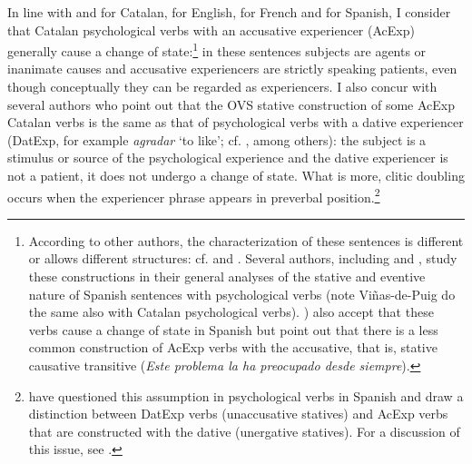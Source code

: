 \documentclass[output=paper,colorlinks,citecolor=brown,modfonts,nonflat]{langsci/langscibook}
\begin{document}
In line with \citet{Ynglès1991, CabréMateu1998, Rossello2008} and \citet[Section 21.5b-c]{GIEC2016} for Catalan, \citet{Pesetsky1995} for English, \citet{Bouchard1995} for French and \citet{Acedo-MatellánMateu2015} for Spanish, I consider that Catalan psychological verbs with an accusative experiencer (AcExp) generally cause a change of state:\footnote{According to other authors, the characterization of these sentences is different or allows different structures: cf. \citet{vanVoorst1992,Arad1999,Landau2010,MarínMcNally2011} and \citet{Fabregas2015experimentante}. Several authors, including \citet{FabregasMarín2012,FábregasMarínMcNally2012,MarínSanchezMarco2012,Ganeshan2014} and \citet{Viñas-de-Puig2014}, study these constructions in their general analyses of the stative and eventive nature of Spanish sentences with psychological verbs (note Viñas-de-Puig do the same also with Catalan psychological verbs). \citealt[83 (4)]{Acedo-MatellánMateu2015}) also accept that these verbs cause a change of state in Spanish but point out that there is a less common construction of AcExp verbs with the accusative, that is, stative causative transitive (\textit{Este problema la ha preocupado desde siempre}).} in these sentences subjects are agents or inanimate causes and accusative experiencers are strictly speaking patients, even though conceptually they can be regarded as experiencers. I also concur with several authors who point out that the OVS stative construction of some AcExp Catalan verbs is the same as that of psychological verbs with a dative experiencer (DatExp, for example \textit{agradar} ‘to like’; cf. \citealt{CabréMateu1998, Ramos2004, Rossello2008, Cuervo2010Cuestiones}, among others): the subject is a stimulus or source of the psychological experience and the dative experiencer is not a patient, it does not undergo a change of state. What is more, clitic doubling occurs when the experiencer phrase appears in preverbal position.\footnote{\citet{Acedo-MatellánMateu2015} have questioned this assumption in psychological verbs in Spanish and draw a distinction between DatExp verbs (unaccusative statives) and AcExp verbs that are constructed with the dative (unergative statives). For a discussion of this issue, see \citet[Section 6.2.4.1]{Royo2017}.}
\end{document}
